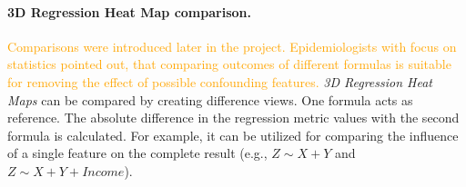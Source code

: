 \documentclass[journal]{style/vgtc} 			          %
\newcommand{\design}[1]{\textcolor{orange}{#1}}
\begin{document}
\paragraph{3D Regression Heat Map comparison.}
\design{
Comparisons were introduced later in the project.
Epidemiologists with focus on statistics pointed out, that comparing outcomes of different formulas is suitable for removing the effect of possible confounding features.
}
\emph{3D Regression Heat Maps} can be compared by creating difference views.
One formula acts as reference.
The absolute difference in the regression metric values with the second formula is calculated. %
For example, it can be utilized for comparing the influence of a single feature on the complete result (e.g., $Z \sim X + Y$ and $Z \sim X + Y + Income$).
\end{document}
